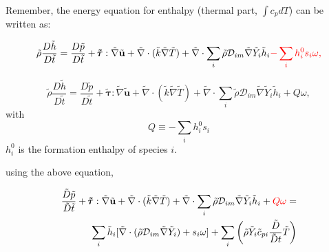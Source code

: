 \documentclass[preprint,12pt,authoryear]{elsarticle}
\begin{document}
Remember, the energy equation for enthalpy {\color{red} (thermal part, $\int c_pdT$) } can be written  as:

\begin{equation}
\begin{split}
        \tilde{\rho}\frac{D  \tilde{h}}{D\tilde{t}}
=
        \frac{D \tilde{p}}{D\tilde{t}}
+       
        \pmb{\tilde{\tau}}:\tilde{\nabla} \tilde{\mathbf{u}} 
+ 
        \tilde{\nabla} \cdot (\tilde{k}\tilde{\nabla} \tilde{T})
+
        \tilde{\nabla} \cdot
        \sum\limits_i 
        \tilde{\rho}\mathcal{D}_{im}\tilde{\nabla}\tilde{Y}_i     
        \tilde{h}_i
        {\color{red}
        -
        \sum_i h_i^0 s_i \omega,
        }
\end{split}
\end{equation}

{\color{red}
\[
       \tilde{\rho}\frac{D  \tilde{h}}{D\tilde{t}}
=
        \frac{D \tilde{p}}{D\tilde{t}}
+       
        \pmb{\tilde{\tau}}:\tilde{\nabla} \tilde{\mathbf{u}} 
+ 
        \tilde{\nabla} \cdot (\tilde{k}\tilde{\nabla} \tilde{T})
+
        \tilde{\nabla} \cdot
        \sum\limits_i 
        \tilde{\rho}\mathcal{D}_{im}\tilde{\nabla}\tilde{Y}_i     
        \tilde{h}_i
        +
        Q\omega,
\]
with
\[
   Q \equiv -\sum_i h_i^0 s_i 
\]
$h_i^0$ is the formation enthalpy of species $i$.
}





using the above equation, 

\begin{equation}
\begin{split}
        \frac{\tilde{D} \tilde{p}}{\tilde{D}\tilde{t}}
        +       
        \pmb{\tilde{\tau}}:\tilde{\nabla} \tilde{\mathbf{u}} 
        + 
        \tilde{\nabla} \cdot (\tilde{k}\tilde{\nabla} \tilde{T})
        +
        \tilde{\nabla} \cdot
        \sum\limits_i 
        \tilde{\rho}\mathcal{D}_{im}\tilde{\nabla}\tilde{Y}_i     
        \tilde{h}_i
        +
        {\color{red} Q\omega}
        =
	\\
        \sum\limits_i
                \tilde{h}_i
                [
                	\tilde{\nabla}\cdot
			(
			\tilde{\rho}\mathcal{D}_{im}\tilde{\nabla}\tilde{Y}_i
			)
			+
        	s_i \omega
		]
        +
        \sum\limits_i
        \left(
                \tilde{\rho}
                \tilde{Y}_i
                \tilde{c}_{pi}
                \frac{\tilde{D}}{\tilde{D} t}
                \tilde{T}
        \right)
\end{split}
\end{equation}
\end{document}
